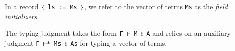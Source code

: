 In a record \texttt{｛\ ls\ :=\ Ms\ ｝}, we refer to the vector of terms
\texttt{Ms} as the \emph{field initializers}.

The typing judgment takes the form \texttt{Γ\ ⊢\ M\ ⦂\ A} and relies on
an auxiliary judgment \texttt{Γ\ ⊢*\ Ms\ ⦂\ As} for typing a vector of
terms.

\begin{fence}
\begin{code}%
\>[0]\AgdaSpace{}%
\AgdaSpace{}%
\AgdaSymbol{:}\AgdaSpace{}%
\AgdaSpace{}%
\AgdaSpace{}%
\AgdaSpace{}%
\AgdaSymbol{\{}\AgdaSymbol{\}}\AgdaSpace{}%
\AgdaSpace{}%
\AgdaSpace{}%
\AgdaSpace{}%
\AgdaSpace{}%
\AgdaSpace{}%
\AgdaSpace{}%
\AgdaSpace{}%
\AgdaSpace{}%
\AgdaSpace{}%
\<%
\\
%
\\[\AgdaEmptyExtraSkip]%
\>[0]\AgdaSpace{}%
\AgdaSpace{}%
\AgdaSymbol{:}\AgdaSpace{}%
\AgdaSpace{}%
\AgdaSpace{}%
\AgdaSpace{}%
\AgdaSpace{}%
\AgdaSpace{}%
\AgdaSpace{}%
\AgdaSpace{}%
\<%
\\
%
\\[\AgdaEmptyExtraSkip]%
\>[0][@{}l@{\AgdaIndent{0}}]%
\>[2]\AgdaSpace{}%
\AgdaSymbol{:}\AgdaSpace{}%
\AgdaSpace{}%
\AgdaSymbol{\{}\AgdaSpace{}%
\AgdaSpace{}%
\AgdaSymbol{\}}\<%
\\
\>[2][@{}l@{\AgdaIndent{0}}]%
\>[4]%
\>[1209I]\AgdaSpace{}%
\AgdaSpace{}%
\AgdaSpace{}%
\AgdaSpace{}%
\<%
\\
\>[.][@{}l@{}]\<[1209I]%
\>[6]\AgdaComment{-----------}\<%
\\
%
\>[4]\AgdaSpace{}%
\AgdaSpace{}%
\AgdaSpace{}%
\AgdaSpace{}%
\AgdaSpace{}%
\AgdaSpace{}%
\<%
\\

\end{code}
\end{fence}

